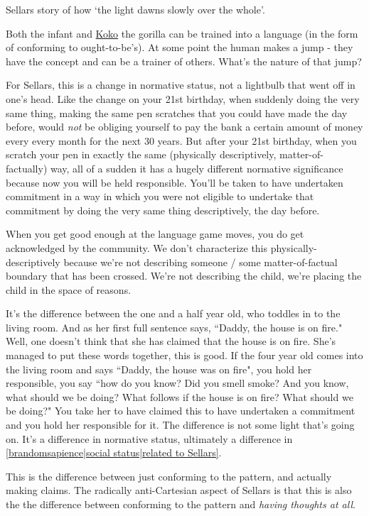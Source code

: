 Sellars story of how `the light dawns slowly over the whole'.

Both the infant and \href{https://en.wikipedia.org/wiki/Koko_(gorilla)}{Koko} the gorilla can be trained into a language (in the form of conforming to ought-to-be's). At some point the human makes a jump - they have the concept and can be a trainer of others. What's the nature of that jump?

For Sellars, this is a change in normative status, not a lightbulb that went off in one's head. Like the change on your 21st birthday, when suddenly doing the very same thing, making the same pen scratches that you could have made the day before, would \emph{not} be obliging yourself to pay the bank a certain amount of money every every month for the next 30 years. But after your 21st birthday, when you scratch your pen in exactly the same (physically descriptively, matter-of-factually) way, all of a sudden it has a hugely different normative significance because now you will be held responsible. You'll be taken to have undertaken commitment in a way in which you were not eligible to undertake that commitment by doing the very same thing descriptively, the day before.

When you get good enough at the language game moves, you do get acknowledged by the community. We don't characterize this physically-descriptively because we're not describing someone / some matter-of-factual boundary that has been crossed. We're not describing the child, we're placing the child in the space of reasons.

It's the difference between the one and a half year old, who toddles in to the living room. And as her first full sentence says, ``Daddy, the house is on fire." Well, one doesn't think that she has claimed that the house is on fire. She's managed to put these words together, this is good. If the four year old comes into the living room and says ``Daddy, the house was on fire", you hold her responsible, you say ``how do you know? Did you smell smoke? And you know, what should we be doing? What follows if the house is on fire? What should we be doing?" You take her to have claimed this to have undertaken a commitment and you hold her responsible for it. The difference is not some light that's going on. It's a difference in normative status, ultimately a difference in \ref{brandomsapience|social status|related to Sellars}.

This is the difference between just conforming to the pattern, and actually making claims. The radically anti-Cartesian aspect of Sellars is that this is also the the difference between conforming to the pattern and \emph{having thoughts at all}.


